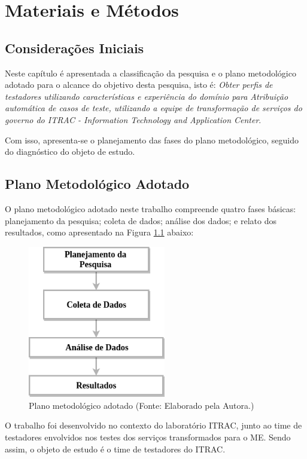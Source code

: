\chapter{Materiais e Métodos}
\label{ch:metodologia}
\section{Considerações Iniciais}
Neste capítulo é apresentada a classificação da pesquisa e o plano metodológico adotado para o alcance do objetivo desta pesquisa, isto é: \textit{Obter perfis de testadores utilizando características e experiência do domínio para Atribuição automática de casos de teste, utilizando a equipe de transformação de serviços do governo do ITRAC - Information Technology and Application Center}.

Com isso, apresenta-se o planejamento das fases do plano metodológico, seguido do diagnóstico do objeto de estudo.

\section{Plano Metodológico Adotado}
\label{sec:planMetodologico}

O plano metodológico adotado neste trabalho compreende quatro fases básicas: planejamento da pesquisa; coleta de dados; análise dos dados; e relato dos resultados, como apresentado  na Figura \ref{fig:PlanoGeral} abaixo:

        \begin{figure}[H]
          \centering
          \includegraphics[width=6cm]{figuras/planoGeral.png}
          \caption{Plano metodológico adotado (Fonte: Elaborado pela Autora.)}
          \label{fig:PlanoGeral}

        \end{figure}

O trabalho foi desenvolvido no contexto do laboratório ITRAC, junto ao time de testadores envolvidos nos testes dos serviços transformados para o ME. Sendo assim, o objeto de estudo é o time de testadores do ITRAC.

